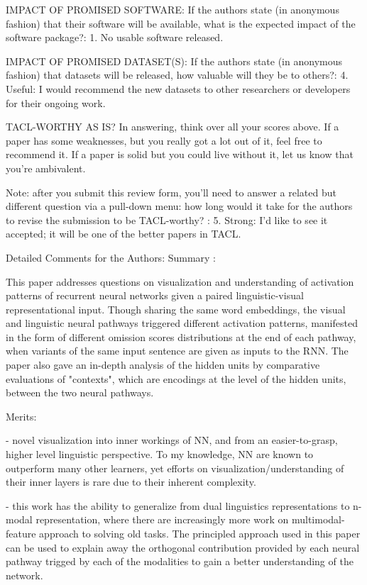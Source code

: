 \documentclass[10pt,a4paper]{letter}
\begin{document}
IMPACT OF PROMISED SOFTWARE:  If the authors state (in anonymous fashion)
that their software will be available, what is the expected impact of the
software package?:
        1. No usable software released.

IMPACT OF PROMISED DATASET(S): If the authors state (in anonymous fashion)
that datasets will be released, how valuable will they be to others?:
        4. Useful: I would recommend the new datasets to other researchers or
developers for their ongoing work.


TACL-WORTHY AS IS? In answering, think over all your scores above. If a
paper has some weaknesses, but you really got a lot out of it, feel free to
recommend it. If a paper is solid but you could live without it, let us know
that you're ambivalent.

Note: after you submit this review form, you'll need to answer a related but
different question via a pull-down menu: how long would it take for the
authors to revise the submission to be TACL-worthy?
:
        5. Strong: I'd like to see it accepted; it will be one of the better papers
in TACL.

Detailed Comments for the Authors:
        Summary :

This paper addresses questions on visualization and understanding of
activation patterns of recurrent neural networks given a paired
linguistic-visual representational input. Though sharing the same word
embeddings, the visual and linguistic neural pathways triggered different
activation patterns, manifested in the form of different omission scores
distributions at the end of each pathway, when variants of the same input
sentence are given as inputs to the RNN. The paper also gave an in-depth
analysis of the hidden units by comparative evaluations of "contexts", which
are encodings at the level of the hidden units, between the two neural
pathways.


Merits:

- novel visualization into inner workings of NN, and from an
easier-to-grasp, higher level linguistic perspective. To my knowledge, NN
are known to outperform many other learners, yet efforts on
visualization/understanding of their inner layers is rare due to their
inherent complexity.

- this work has the ability to generalize from dual linguistics
representations to n-modal representation, where there are increasingly more
work on multimodal-feature approach to solving old tasks. The principled
approach used in this paper can be used to explain away the orthogonal
contribution provided by each neural pathway trigged by each of the
modalities to gain a better understanding of the network.
\end{document}
